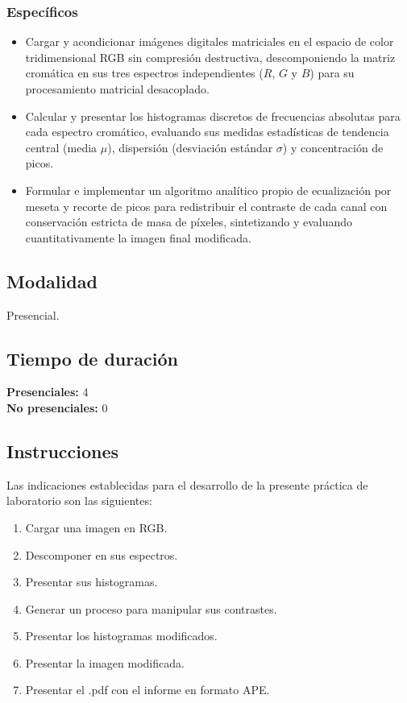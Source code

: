 \documentclass{article}
\begin{document}
\subsubsection{Específicos}
\begin{itemize}
    \item Cargar y acondicionar im\'agenes digitales matriciales en el espacio de color tridimensional RGB sin compresi\'on destructiva, descomponiendo la matriz crom\'atica en sus tres espectros independientes ($R$, $G$ y $B$) para su procesamiento matricial desacoplado.
    \item Calcular y presentar los histogramas discretos de frecuencias absolutas para cada espectro crom\'atico, evaluando sus medidas estad\'isticas de tendencia central (media $\mu$), dispersi\'on (desviaci\'on est\'andar $\sigma$) y concentraci\'on de picos.
    \item Formular e implementar un algoritmo anal\'itico propio de ecualizaci\'on por meseta y recorte de picos para redistribuir el contraste de cada canal con conservaci\'on estricta de masa de p\'ixeles, sintetizando y evaluando cuantitativamente la imagen final modificada.
\end{itemize}

\subsection{Modalidad}
Presencial.

\subsection{Tiempo de duración}
\textbf{Presenciales:} 4\\
\textbf{No presenciales:} 0

\subsection{Instrucciones}
Las indicaciones establecidas para el desarrollo de la presente práctica de laboratorio son las siguientes:
\begin{enumerate}
    \item Cargar una imagen en RGB.
    \item Descomponer en sus espectros.
    \item Presentar sus histogramas.
    \item Generar un proceso para manipular sus contrastes.
    \item Presentar los histogramas modificados.
    \item Presentar la imagen modificada.
    \item Presentar el .pdf con el informe en formato APE.
\end{enumerate}
\end{document}
